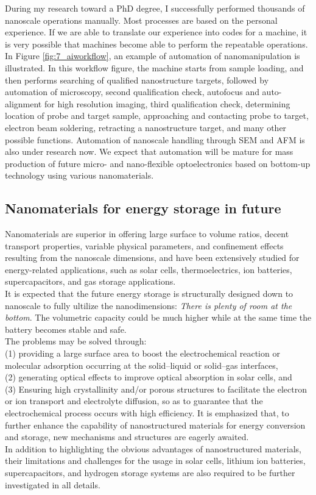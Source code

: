 During my research toward a PhD degree, I successfully performed thousands of nanoscale operations manually. Most processes are based on the personal experience.  
If we are able to translate our experience into codes for a machine, it is very possible that machines become able to perform the repeatable operations. In Figure \ref{fig:7_aiworkflow}, an example of automation of nanomanipulation is illustrated. In this workflow figure, the machine starts from sample loading, and then performs searching of qualified nanostructure targets, followed by automation of microscopy, second qualification check, autofocus and auto-alignment for high resolution imaging, third qualification check, determining location of probe and target sample, approaching and contacting probe to target, electron beam soldering, retracting a nanostructure target, and many other possible functions. 
Automation of nanoscale handling through SEM and AFM is also under research now. \cite{Fatikow1997Microsystem} We expect that automation will be mature for mass production of future micro- and nano-flexible optoelectronics based on bottom-up technology using various nanomaterials. 

\subsection{Nanomaterials for energy storage in future}
Nanomaterials are superior in offering large surface to volume ratios, decent transport properties, variable physical parameters, and confinement effects resulting from the nanoscale dimensions, and have been extensively studied for energy-related applications, such as solar cells, thermoelectrics, ion batteries, supercapacitors, and gas storage applications.\\
It is expected that the future energy storage is structurally designed down to nanoscale to fully ultilize the nanodimensions: \textit{There is plenty of room at the bottom}. The volumetric capacity could be much higher while at the same time the battery becomes stable and safe. \\
The problems may be solved through:\\
(1) providing a large surface area to boost the electrochemical reaction or molecular adsorption occurring at the solid–liquid or solid–gas interfaces, \\
(2) generating optical effects to improve optical absorption in solar cells, and \\
(3) Ensuring high crystallinity and/or porous structures to facilitate the electron or ion transport and electrolyte diffusion, so as to guarantee that the electrochemical process occurs with high efficiency. It is emphasized that, to further enhance the capability of nanostructured materials for energy conversion and storage, new mechanisms and structures are eagerly awaited. \\
In addition to highlighting the obvious advantages of nanostructured materials, their limitations and challenges for the usage in solar cells, lithium ion batteries, supercapacitors, and hydrogen storage systems are also required to be further investigated in all details.\cite{qifengzhang2013csr}\\


